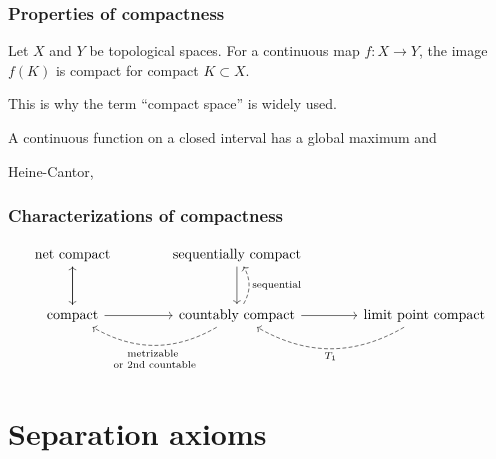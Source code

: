 \documentclass{../crs}
\begin{document}
\subsection{Properties of compactness}
\begin{thm}
Let $X$ and $Y$ be topological spaces.
For a continuous map $f\colon X\to Y$, the image $f(K)$ is compact for compact $K\subset X$.
\end{thm}

\begin{rmk}
This is why the term ``compact space'' is widely used.
\end{rmk}

\begin{cor}
A continuous function on a closed interval has a global maximum and
\end{cor}

Heine-Cantor,



\subsection{Characterizations of compactness}
\[
\begin{tikzcd}[column sep=large,row sep=large]
\text{net compact} \arrow{d} & \text{sequentially compact} \arrow{d} & \\
\text{compact} \arrow{u}\arrow{r} & \text{countably compact} \arrow{r}\arrow[dashed,bend left]{l}{\scriptsize\begin{tabular}{c}\text{metrizable }\\or\text{ 2nd countable}\end{tabular}} \arrow[dashed,bend right,swap]{u}{\text{sequential}} & \text{limit point compact} \arrow[dashed,bend left]{l}{T_1}
\end{tikzcd}
\]






























\chapter{Separation axioms}
\end{document}

